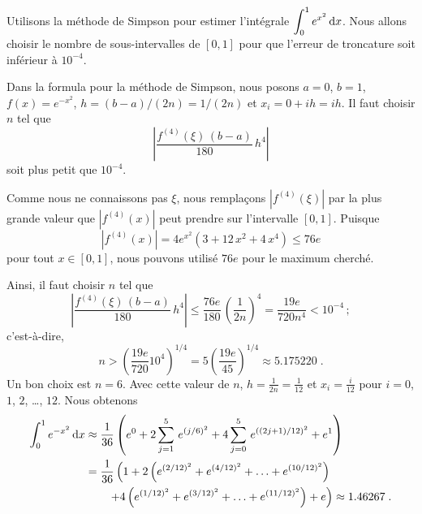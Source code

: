{\begin{egg}
Utilisons la méthode de Simpson pour estimer l'intégrale
$\displaystyle \int_0^1 e^{x^2}\,\mathrm{d}x$.  Nous allons choisir le nombre de
sous-intervalles de $[0,1]$ pour que l'erreur de troncature soit
inférieur à $10^{-4}$.

Dans la formula pour la méthode de Simpson, nous posons $a=0$, $b=1$,
$f(x) = e^{-x^2}$, $h= (b-a)/(2n) = 1/(2n)$ et $x_i = 0 +i h = i h$.
Il faut choisir $n$ tel que
\[
\left| \frac{f^{(4)}(\xi)\,(b-a)}{180}\, h^4 \right|
\]
soit plus petit que $10^{-4}$.

Comme nous ne connaissons pas $\xi$, nous remplaçons $|f^{(4)}(\xi)|$ par la
plus grande valeur que $|f^{(4)}(x)|$ peut prendre sur l'intervalle
$[0,1]$.  Puisque
\[
|f^{(4)}(x)| = 4e^{x^2}\left( 3 + 12\,x^2 + 4\,x^4 \right) \leq 76 e
\]
pour tout $x\in [0,1]$, nous pouvons utilisé $76 e$ pour le maximum
cherché.

Ainsi, il faut choisir $n$ tel que
\[
\left| \frac{f^{(4)}(\xi)\,(b-a)}{180}\, h^4 \right|
\leq \frac{76e}{180}\, \left(\frac{1}{2n}\right)^4 
= \frac{19 e}{720 n^4} < 10^{-4} \, ;
\]
c'est-à-dire,
\[
n > \left( \frac{19 e}{720} 10^4\right)^{1/4}
= 5 \left(\frac{19 e}{45}\right)^{1/4} \approx 5.175220 \; .
\]
Un bon choix est $n=6$.  Avec cette valeur de $n$,
$\displaystyle h = \frac{1}{2n} = \frac{1}{12}$ et
$\displaystyle x_i = \frac{i}{12}$ pour $i=0$, $1$, $2$, \ldots, $12$.
Nous obtenons
\begin{align*}
\int_0^1 e^{-x^2}\,\mathrm{d}x & \approx 
\frac{1}{36}\left(e^0 + 2\sum_{j=1}^{5}\,e^{(j/6)^2}
+ 4 \sum_{j=0}^{5}\,e^{((2j+1)/12)^2} + e^1\right) \\
&= \frac{1}{36}\left( 1 + 2 \left( e^{(2/12)^2} + e^{(4/12)^2} +\ldots
+ e^{(10/12)^2}\right) \right. \\
& \qquad \left. + 4 \left(e^{(1/12)^2} + e^{(3/12)^2} + \ldots
+ e^{(11/12)^2} \right) + e \right)
\approx 1.46267 \; .
\end{align*}
\label{S1}
\end{egg}

}
